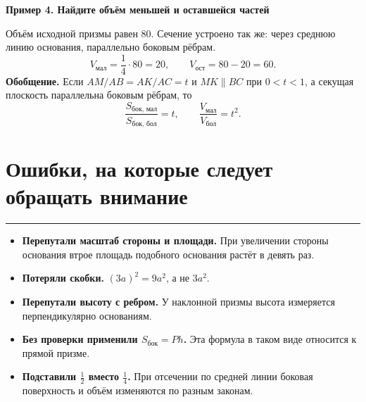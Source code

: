 \documentclass[a4paper,12pt]{article}
\newcommand{\topic}[1]{\needspace{6\baselineskip}\section{#1}\vspace{-1.5mm}\noindent\textcolor{accent}{\rule{\linewidth}{0.45pt}}\vspace{-2mm}}
\newcommand{\ex}[1]{\par\medskip\noindent\textcolor{darkaccent}{\textbf{#1}}\par\smallskip}
\begin{document}
\ex{Пример 4. Найдите объём меньшей и оставшейся частей}
Объём исходной призмы равен $80$. Сечение устроено так же: через среднюю линию основания, параллельно боковым рёбрам.
\[
V_{\text{мал}}=\frac14\cdot80=\boxed{20},\qquad
V_{\text{ост}}=80-20=\boxed{60}.
\]
\textbf{Обобщение.} Если $AM/AB=AK/AC=t$ и $MK\parallel BC$ при $0<t<1$, а секущая плоскость параллельна боковым рёбрам, то
\[
\frac{S_{\text{бок, мал}}}{S_{\text{бок, бол}}}=t,
\qquad
\frac{V_{\text{мал}}}{V_{\text{бол}}}=t^2.
\]

\topic{Ошибки, на которые следует обращать внимание}
\begin{itemize}
\item \textbf{Перепутали масштаб стороны и площади.} При увеличении стороны основания втрое площадь подобного основания растёт в девять раз.
\item \textbf{Потеряли скобки.} $(3a)^2=9a^2$, а не $3a^2$.
\item \textbf{Перепутали высоту с ребром.} У наклонной призмы высота измеряется перпендикулярно основаниям.
\item \textbf{Без проверки применили $S_{\text{бок}}=Ph$.} Эта формула в таком виде относится к прямой призме.
\item \textbf{Подставили $\frac12$ вместо $\frac14$.} При отсечении по средней линии боковая поверхность и объём изменяются по разным законам.
\end{itemize}
\end{document}
